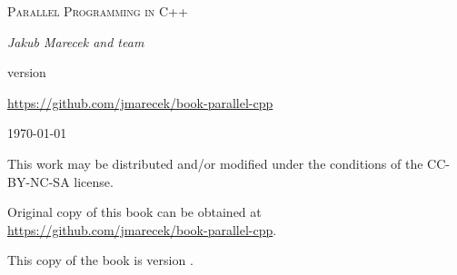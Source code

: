 \begin{titlepage}
	\centering
	\vspace{2cm}
	{\scshape\huge Parallel Programming in C++\par}
	\vspace{2cm}
	{\Large\itshape Jakub Marecek and team\par}
	\vfill
	version \version\par
	\href{https://github.com/jmarecek/book-parallel-cpp}{https://github.com/jmarecek/book-parallel-cpp}

	\vfill

	{\large \today\par}
\end{titlepage}

\pagestyle{empty}
\begingroup
\footnotesize
\parindent 0pt
\parskip \baselineskip
\vfill

This work may be distributed and/or modified under the conditions of the CC-BY-NC-SA license.

Original copy of this book can be obtained at \href{https://github.com/jmarecek/book-parallel-cpp}{https://github.com/jmarecek/book-parallel-cpp}.

This copy of the book is version \version.

\vfill

\vspace*{2\baselineskip}


\endgroup
\clearpage
\pagestyle{plain}